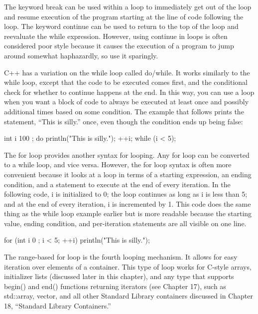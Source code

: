 The keyword break can be used within a loop to immediately get out of the loop and resume execution of the program starting at the line of code following the loop. The keyword continue can be used to return to the top of the loop and reevaluate the while expression. However, using continue in loops is often considered poor style because it causes the execution of a program to jump around somewhat haphazardly, so use it sparingly.


C++ has a variation on the while loop called do/while. It works similarly to the while loop, except that the code to be executed comes first, and the conditional check for whether to continue happens at the end. In this way, you can use a loop when you want a block of code to always be executed at least once and possibly additional times based on some condition. The example that follows prints the statement, “This is silly.” once, even though the condition ends up being false:

\begin{cpp}
int i { 100 };
do {
    println("This is silly.");
    ++i;
} while (i < 5);
\end{cpp}


The for loop provides another syntax for looping. Any for loop can be converted to a while loop, and vice versa. However, the for loop syntax is often more convenient because it looks at a loop in terms of a starting expression, an ending condition, and a statement to execute at the end of every iteration. In the following code, i is initialized to 0; the loop continues as long as i is less than 5; and at the end of every iteration, i is incremented by 1. This code does the same thing as the while loop example earlier but is more readable because the starting value, ending condition, and per-iteration statements are all visible on one line.

\begin{cpp}
for (int i { 0 }; i < 5; ++i) {
    println("This is silly.");
}
\end{cpp}


The range-based for loop is the fourth looping mechanism. It allows for easy iteration over elements of a container. This type of loop works for C-style arrays, initializer lists (discussed later in this chapter), and any type that supports begin() and end() functions returning iterators (see Chapter 17), such as std::array, vector, and all other Standard Library containers discussed in Chapter 18, “Standard Library Containers.”

